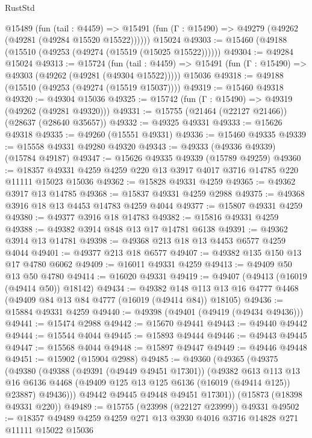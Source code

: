 \begin{lexlean}{RustStd}
\begin{coremodule}
    @15489
      (fun (tail : @4459) =>
      @15491 (fun (Γ : @15490) => @49279 (@49262 (@49281 (@49284 @15520 @15522))))))
    @15024
@49303 := @15460 (@49188 (@15510 (@49253 (@49274 (@15519 (@15025 @15522))))))
@49304 := @49284 @15024
@49313 := @15724
    (fun (tail : @4459) => @15491 (fun (Γ : @15490) => @49303 (@49262 (@49281 (@49304 @15522)))))
    @15036
@49318 := @49188 (@15510 (@49253 (@49274 (@15519 @15037))))
@49319 := @15460 @49318
@49320 := @49304 @15036
@49325 := @15742 (fun (Γ : @15490) => @49319 (@49262 (@49281 @49320)))
@49331 := @15755 (@21464 (@22127 @21466)) (@28637 (@28640 @35657))
@49332 := @49325 @49331
@49333 := @15626 @49318
@49335 := @49260 (@15551 @49331)
@49336 := @15460 @49335
@49339 := @15558 @49331 @49280 @49320
@49343 := @49333 (@49336 @49339) (@15784 @49187)
@49347 := @15626 @49335 @49339 (@15789 @49259)
@49360 := @18357 @49331 @4259 @4259 @220 @13 @3917 @4017 @3716 @14785 @220 @11111 @15023 @15036
@49362 := @15828 @49331 @4259
@49365 := @49362 @3917 @13 @14785
@49368 := @15837 @49331 @4259 @2988
@49375 := @49368 @3916 @18 @13 @4453 @14783 @4259 @4044
@49377 := @15807 @49331 @4259
@49380 := @49377 @3916 @18 @14783
@49382 := @15816 @49331 @4259
@49388 := @49382 @3914 @848 @13 @17 @14781 @6138
@49391 := @49362 @3914 @13 @14781
@49398 := @49368 @213 @18 @13 @4453 @6577 @4259 @4044
@49401 := @49377 @213 @18 @6577
@49407 := @49382 @135 @150 @13 @17 @4780 @6062
@49409 := @16011 @49331 @4259
@49413 := @49409 @50 @13 @50 @4780
@49414 := @16020 @49331
@49419 := @49407 (@49413 (@16019 (@49414 @50)) @18142)
@49434 := @49382
    @148
    @113
    @13
    @16
    @4777
    @4468
    (@49409 @84 @13 @84 @4777 (@16019 (@49414 @84)) @18105)
@49436 := @15884 @49331 @4259
@49440 := @49398 (@49401 (@49419 (@49434 @49436)))
@49441 := @15474 @2988
@49442 := @15670 @49441
@49443 := @49440 @49442
@49444 := @15544 @4044
@49445 := @15893 @49444
@49446 := @49443 @49445
@49447 := @15568 @4044
@49448 := @15897 @49447
@49449 := @49446 @49448
@49451 := @15902 (@15904 @2988)
@49485 := @49360
    (@49365
      (@49375
        (@49380
          (@49388
            (@49391 (@49449 @49451 @17301))
            (@49382
              @613
              @113
              @13
              @16
              @6136
              @4468
              (@49409 @125 @13 @125 @6136 (@16019 (@49414 @125)) @23887)
              @49436)))
        @49442
        @49445
        @49448
        @49451
        @17301))
    (@15873 (@18398 @49331 @220))
@49489 := @15755 (@23998 (@22127 @23999)) @49331
@49502 := @18357 @49489 @4259 @4259 @271 @13 @3930 @4016 @3716 @14828 @271 @11111 @15022 @15036

\end{coremodule}
\end{lexlean}
